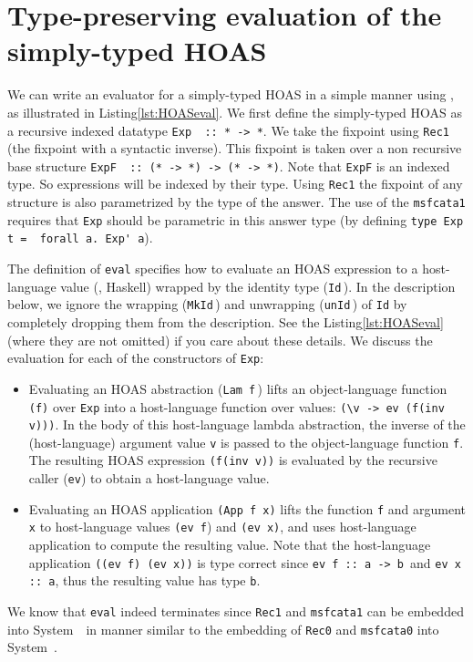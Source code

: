 \section{Type-preserving evaluation of the simply-typed HOAS}
\label{sec:HOASeval}
We can write an evaluator for a simply-typed HOAS in a simple manner
using \msfit{*\to*}, as illustrated in Listing\;\ref{lst:HOASeval}.
We first define the simply-typed HOAS as a recursive indexed datatype
\lstinline{Exp  :: * -> *}. We take the fixpoint using \lstinline{Rec1}
(the fixpoint with a syntactic inverse). This fixpoint is taken over
a non recursive base structure \lstinline{ExpF  :: (* -> *) -> (* -> *)}.
Note that \lstinline{ExpF} is an indexed type. So expressions will be indexed
by their type. Using \lstinline{Rec1} the fixpoint of any structure is also
parametrized by the type of the answer. The use of the \lstinline{msfcata1}
requires that \lstinline{Exp} should be parametric in this answer type
(by defining \lstinline{type Exp  t =  forall a. Exp' a}). 

The definition of \lstinline{eval} specifies how to evaluate
an HOAS expression to a host-language value (\ie, Haskell) wrapped by
the identity type (\lstinline{Id}\,). In the description below, we ignore
the wrapping (\lstinline{MkId}\,) and unwrapping (\lstinline{unId}\,) of
\lstinline{Id} by completely dropping them from the description.
See the Listing\;\ref{lst:HOASeval} (where they are not omitted)
if you care about these details. We discuss the evaluation for each of
the constructors of \lstinline{Exp}:
\begin{itemize}
	\item Evaluating an HOAS abstraction (\lstinline{Lam f}\,) lifts
		an object-language function \lstinline{(f)} over \lstinline{Exp}
		into a host-language function over values:
		\lstinline{(\v -> ev (f(inv v)))}.
		In the body of this host-language lambda abstraction,
		the inverse of the (host-language) argument value \lstinline{v}
		is passed to the object-language function \lstinline{f}.
		The resulting HOAS expression \lstinline{(f(inv v))} is
		evaluated by the recursive caller (\lstinline{ev}) to
		obtain a host-language value.

	\item Evaluating an HOAS application \lstinline{(App f x)} lifts
		the function \lstinline{f} and argument \lstinline{x} to
		host-language values \lstinline{(ev f}) and \lstinline{(ev x)},
		and uses host-language application to compute
		the resulting value. Note that the host-language application
		\lstinline{((ev f) (ev x))} is type correct since
		\lstinline{ev f :: a -> b}\, and \lstinline{ev x :: a},
		thus the resulting value has type \lstinline{b}.
\end{itemize}
We know that \lstinline{eval} indeed terminates since \lstinline{Rec1} and
\lstinline{msfcata1} can be embedded into System~\Fw\ in manner similar to
the embedding of \lstinline{Rec0} and \lstinline{msfcata0} into System~\Fw.

